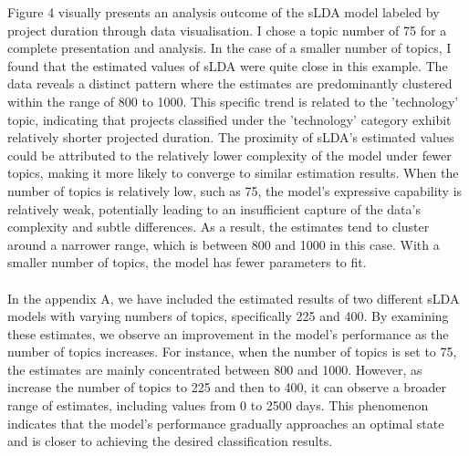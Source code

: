 \documentclass[12pt,twoside]{article}
\begin{document}
Figure 4 visually presents an analysis outcome of the sLDA model labeled by project duration through data visualisation. I chose a topic number of 75 for a complete presentation and analysis. In the case of a smaller number of topics, I found that the estimated values of sLDA were quite close in this example. The data reveals a distinct pattern where the estimates are predominantly clustered within the range of 800 to 1000. This specific trend is related to the 'technology' topic, indicating that projects classified under the 'technology' category exhibit relatively shorter projected duration. The proximity of sLDA's estimated values could be attributed to the relatively lower complexity of the model under fewer topics, making it more likely to converge to similar estimation results. When the number of topics is relatively low, such as 75, the model's expressive capability is relatively weak, potentially leading to an insufficient capture of the data's complexity and subtle differences. As a result, the estimates tend to cluster around a narrower range, which is between 800 and 1000 in this case. With a smaller number of topics, the model has fewer parameters to fit.\\\\


In the appendix A, we have included the estimated results of two different sLDA models with varying numbers of topics, specifically 225 and 400. By examining these estimates, we observe an improvement in the model's performance as the number of topics increases. For instance, when the number of topics is set to 75, the estimates are mainly concentrated between 800 and 1000. However, as increase the number of topics to 225 and then to 400, it can observe a broader range of estimates, including values from 0 to 2500 days. This phenomenon indicates that the model's performance gradually approaches an optimal state and is closer to achieving the desired classification results.\\\\
\end{document}
